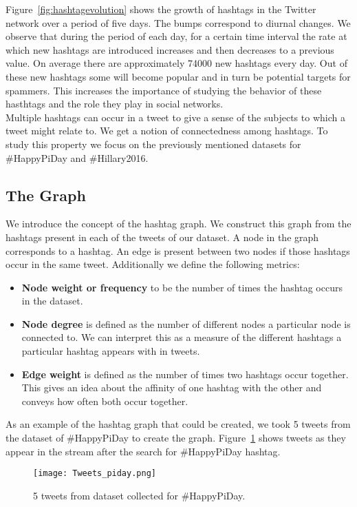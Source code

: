 \documentclass[journal, a4paper, 12pt]{article}
\begin{document}
Figure~\ref{fig:hashtagevolution} shows the growth of hashtags in the Twitter network over a period of five days. The bumps correspond to diurnal changes. We observe that during the period of each day, for a certain time interval the rate at which new hashtags are introduced increases and then decreases to a previous value. On average there are approximately 74000 new hashtags every day. Out of these new hashtags some will become popular and in turn be potential targets for spammers. This increases the importance of studying the behavior of these hasthtags and the role they play in social networks. \\

Multiple hashtags can occur in a tweet to give a sense of the subjects to which a tweet might relate to. We get a notion of connectedness among hashtags. To study this property we focus on the previously mentioned datasets for \#HappyPiDay and \#Hillary2016.


\subsection{The Graph}
We introduce the concept of the hashtag graph. We construct this graph from the hashtags present in each of the tweets of our dataset. A node in the graph corresponds to a hashtag. An edge is present between two nodes if those hashtags occur in the same tweet. Additionally we define the following metrics:
\begin{itemize}
\item
\textbf{Node weight or frequency} to be the number of times the hashtag occurs in the dataset.
\item
\textbf{Node degree} is defined as the number of different nodes a particular node is connected to. We can interpret this as a measure of the different hashtags a particular hashtag appears with in tweets.
\item
\textbf{Edge weight} is defined as the number of times two hashtags occur together. This gives an idea about the affinity of one hashtag with the other and conveys how often both occur together.
\end{itemize}

As an example of the hashtag graph that could be created, we took 5 tweets from the dataset of \#HappyPiDay to create the graph. Figure~\ref{fig:tweets_piday} shows tweets as they appear in the stream after the search for \#HappyPiDay hashtag.
\\

  \begin{figure}[!hbt]
		\begin{center}
		\texttt{[image: Tweets\_piday.png]}
		\caption{5 tweets from dataset collected for \#HappyPiDay.}
		\label{fig:tweets_piday}
		\end{center}
	\end{figure}
    
\end{document}
